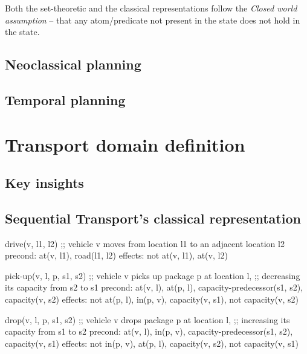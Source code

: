 Both the set-theoretic and the classical representations follow the \textit{Closed world assumption} -- that any atom/predicate not present in the state does not hold in the state.

\subsection{Neoclassical planning}



\subsection{Temporal planning}



\section{Transport domain definition}


\subsection{Key insights}


\subsection{Sequential Transport's classical representation}

\begin{code}
drive(v, l1, l2)
  ;; vehicle v moves from location l1 to an adjacent location l2
  precond: at(v, l1), road(l1, l2)
  effects: not at(v, l1), at(v, l2)

pick-up(v, l, p, s1, s2)
  ;; vehicle v picks up package p at location l,
  ;; decreasing its capacity from s2 to s1
  precond: at(v, l), at(p, l), capacity-predecessor(s1, s2),
           capacity(v, s2)
  effects: not at(p, l), in(p, v), capacity(v, s1),
           not capacity(v, s2)
  
drop(v, l, p, s1, s2)
  ;; vehicle v drops package p at location l,
  ;; increasing its capacity from s1 to s2
  precond: at(v, l), in(p, v), capacity-predecessor(s1, s2),
  		   capacity(v, s1)
  effects: not in(p, v), at(p, l), capacity(v, s2),
           not capacity(v, s1)
\end{code}

